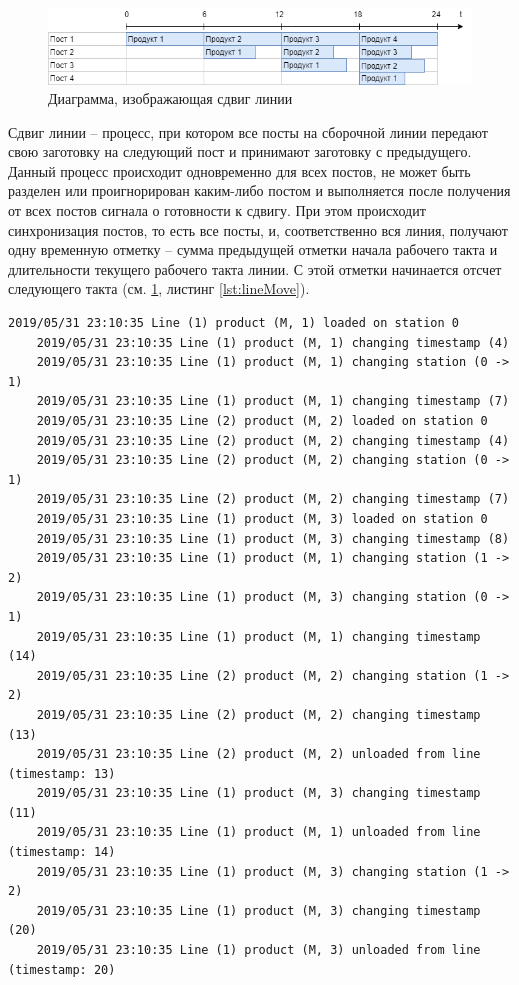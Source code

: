 \begin{figure}[ht]
	\centering
	\includegraphics[width=\linewidth]{pics/assemblyDiagram.png}
	\caption{Диаграмма, изображающая сдвиг линии}
	\label{fig:lineDiagram}
\end{figure}

\indent Сдвиг линии -- процесс, при котором все посты на сборочной линии передают свою заготовку на следующий пост и принимают заготовку с предыдущего.
Данный процесс происходит одновременно для всех постов, не может быть разделен или проигнорирован каким-либо постом и выполняется после получения от всех постов сигнала о готовности к сдвигу.
При этом происходит синхронизация постов, то есть все посты, и, соответственно вся линия, получают одну временную отметку -- сумма предыдущей отметки начала рабочего такта и длительности текущего рабочего такта линии.
С этой отметки начинается отсчет следующего такта (см. \ref{fig:lineDiagram}, листинг \ref{lst:lineMove}).


\begin{lstlisting}[caption={Интерфейс ресурса},label={lst:assemblyLog},language=Golang]
	2019/05/31 23:10:35 Line (1) product (M, 1) loaded on station 0
	2019/05/31 23:10:35 Line (1) product (M, 1) changing timestamp (4)
	2019/05/31 23:10:35 Line (1) product (M, 1) changing station (0 -> 1)
	2019/05/31 23:10:35 Line (1) product (M, 1) changing timestamp (7)
	2019/05/31 23:10:35 Line (2) product (M, 2) loaded on station 0
	2019/05/31 23:10:35 Line (2) product (M, 2) changing timestamp (4)
	2019/05/31 23:10:35 Line (2) product (M, 2) changing station (0 -> 1)
	2019/05/31 23:10:35 Line (2) product (M, 2) changing timestamp (7)
	2019/05/31 23:10:35 Line (1) product (M, 3) loaded on station 0
	2019/05/31 23:10:35 Line (1) product (M, 3) changing timestamp (8)
	2019/05/31 23:10:35 Line (1) product (M, 1) changing station (1 -> 2)
	2019/05/31 23:10:35 Line (1) product (M, 3) changing station (0 -> 1)
	2019/05/31 23:10:35 Line (1) product (M, 1) changing timestamp (14)
	2019/05/31 23:10:35 Line (2) product (M, 2) changing station (1 -> 2)
	2019/05/31 23:10:35 Line (2) product (M, 2) changing timestamp (13)
	2019/05/31 23:10:35 Line (2) product (M, 2) unloaded from line (timestamp: 13)
	2019/05/31 23:10:35 Line (1) product (M, 3) changing timestamp (11)
	2019/05/31 23:10:35 Line (1) product (M, 1) unloaded from line (timestamp: 14)
	2019/05/31 23:10:35 Line (1) product (M, 3) changing station (1 -> 2)
	2019/05/31 23:10:35 Line (1) product (M, 3) changing timestamp (20)
	2019/05/31 23:10:35 Line (1) product (M, 3) unloaded from line (timestamp: 20)
\end{lstlisting}


